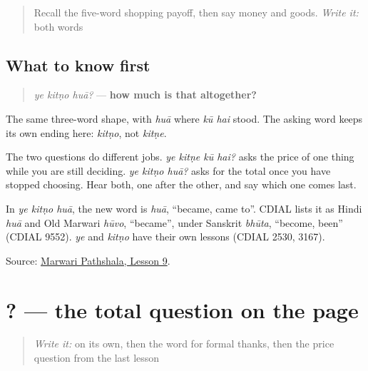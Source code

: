 \begin{quote}
Recall the five-word shopping payoff, then say money and goods. \emph{Write it:} both words
\end{quote}

\subsection*{What to know first}
\begin{quote}
\emph{ye kitṇo huā?} — \textbf{how much is that altogether?}
\end{quote}

The same three-word shape, with \emph{huā} where \emph{kū hai} stood. The asking word keeps its own ending here: \emph{kitṇo}, not \emph{kitṇe}.

The two questions do different jobs. \emph{ye kitṇe kū hai?} asks the price of one thing while you are still deciding. \emph{ye kitṇo huā?} asks for the total once you have stopped choosing. Hear both, one after the other, and say which one comes last.

\begin{cousinweb}
In \emph{ye kitṇo huā}, the new word is \emph{huā}, \textquotedblleft{}became, came to\textquotedblright{}. CDIAL lists it as Hindi \emph{huā} and Old Marwari \emph{hūvo}, \textquotedblleft{}became\textquotedblright{}, under Sanskrit \emph{bhūta}, \textquotedblleft{}become, been\textquotedblright{} (CDIAL 9552). \emph{ye} and \emph{kitṇo} have their own lessons (CDIAL 2530, 3167).
\end{cousinweb}

\begin{tcolorbox}[breakable,colback=teal!4,colframe=teal!35!black,title={Before you move on}]
Source: \href{https://www.marwaripathshala.com/marwari-lesson-9-english}{Marwari Pathshala, Lesson 9}.
\end{tcolorbox}
\section[\texorpdfstring{\mw{ये} \mw{कितणो} \mw{हुआ}? (ye kitṇo huā?)}{ये कितणो हुआ? (ye kitṇo huā?)}]{  ? — the total question on the page}

\label{lesson:MW-C22-total-question}



\begin{quote}
\emph{Write it:} \textbf{} on its own, then the word for formal thanks, then the price question from the last lesson
\end{quote}

